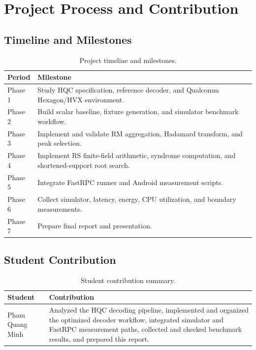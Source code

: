 \documentclass[12pt,a4paper]{report}
\begin{document}
\chapter{Project Process and Contribution}
\label{chap:process}

\section{Timeline and Milestones}
\begin{table}[h]
\centering
\caption{Project timeline and milestones.}
\begin{tabular}{p{3.2cm}p{9.2cm}}
\toprule
Period & Milestone\\
\midrule
Phase 1 & Study HQC specification, reference decoder, and Qualcomm Hexagon/HVX environment.\\
Phase 2 & Build scalar baseline, fixture generation, and simulator benchmark workflow.\\
Phase 3 & Implement and validate RM aggregation, Hadamard transform, and peak selection.\\
Phase 4 & Implement RS finite-field arithmetic, syndrome computation, and shortened-support root search.\\
Phase 5 & Integrate FastRPC runner and Android measurement scripts.\\
Phase 6 & Collect simulator, latency, energy, CPU utilization, and boundary measurements.\\
Phase 7 & Prepare final report and presentation.\\
\bottomrule
\end{tabular}
\end{table}

\section{Student Contribution}
\begin{table}[h]
\centering
\caption{Student contribution summary.}
\begin{tabular}{p{3.2cm}p{9.2cm}}
\toprule
Student & Contribution\\
\midrule
Pham Quang Minh & Analyzed the HQC decoding pipeline, implemented and organized the optimized decoder workflow, integrated simulator and FastRPC measurement paths, collected and checked benchmark results, and prepared this report.\\
\bottomrule
\end{tabular}
\end{table}
\end{document}
